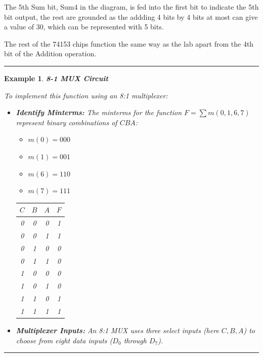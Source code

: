 \documentclass[12pt]{article}
\newtheorem{example}{Example}
\newenvironment{examp}
{\vspace{0.5cm}
 \hrule
\vspace{0.5cm}
\begin{example}}
{\hrule
\vspace{0.5cm}
\end{example}}
\begin{document}
The 5th Sum bit, Sum4 in the diagram, is fed into the first bit to indicate the
5th bit output, the rest are grounded as the addding 4 bits by 4 bits at most
can give a value of 30, which can be represented with 5 bits.

The rest of the 74153 chips function the same way as the lab apart from the 4th
bit of the Addition operation.

\begin{examp}
	\textbf{8-1 MUX Circuit}

	To implement this function using an 8:1 multiplexer:

	\begin{itemize}
		\item \textbf{Identify Minterms:} The minterms for the function \( F = \sum m(0, 1, 6, 7) \) represent binary combinations of \( CBA \):
		      \begin{itemize}
			      \item \( m(0) = 000 \)
			      \item \( m(1) = 001 \)
			      \item \( m(6) = 110 \)
			      \item \( m(7) = 111 \)
		      \end{itemize}
		      \begin{center}
			      \begin{tabular}{|c|c|c|c|}
				      \hline
				      \( C \) & \( B \) & \( A \) & \( F \) \\
				      \hline
				      0       & 0       & 0       & 1       \\
				      0       & 0       & 1       & 1       \\
				      0       & 1       & 0       & 0       \\
				      0       & 1       & 1       & 0       \\
				      1       & 0       & 0       & 0       \\
				      1       & 0       & 1       & 0       \\
				      1       & 1       & 0       & 1       \\
				      1       & 1       & 1       & 1       \\
				      \hline
			      \end{tabular}
		      \end{center}
		\item \textbf{Multiplexer Inputs:} An 8:1 MUX uses three select inputs (here \( C, B, A \)) to choose from eight data inputs (\( D_0 \) through \( D_7 \)).

\end{itemize}
\end{examp}
\end{document}
